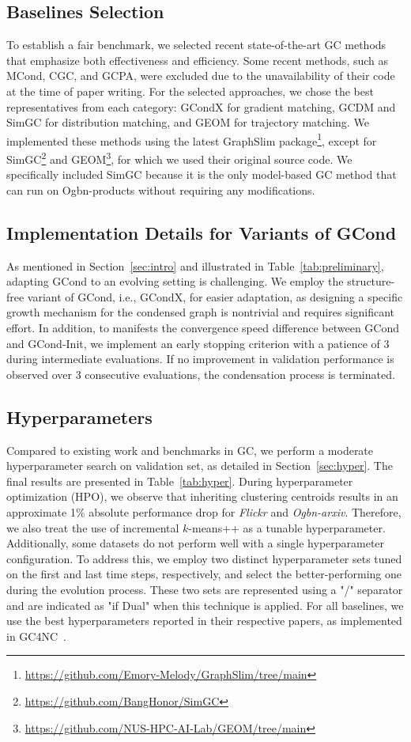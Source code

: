 \subsection{Baselines Selection}
To establish a fair benchmark, we selected recent state-of-the-art GC methods that emphasize both effectiveness and efficiency. Some recent methods, such as MCond, CGC, and GCPA, were excluded due to the unavailability of their code at the time of paper writing. For the selected approaches, we chose the best representatives from each category: GCondX for gradient matching, GCDM and SimGC for distribution matching, and GEOM for trajectory matching. We implemented these methods using the latest GraphSlim package\footnote{\url{https://github.com/Emory-Melody/GraphSlim/tree/main}}, except for SimGC\footnote{\url{https://github.com/BangHonor/SimGC}} and GEOM\footnote{\url{https://github.com/NUS-HPC-AI-Lab/GEOM/tree/main}}, for which we used their original source code. We specifically included SimGC because it is the only model-based GC method that can run on Ogbn-products without requiring any modifications.


\subsection{Implementation Details for Variants of GCond}
As mentioned in Section~\ref{sec:intro} and illustrated in Table~\ref{tab:preliminary}, adapting GCond to an evolving setting is challenging. We employ the structure-free variant of GCond, i.e., GCondX, for easier adaptation, as designing a specific growth mechanism for the condensed graph is nontrivial and requires significant effort.
In addition, to manifests the convergence speed difference between GCond and GCond-Init, we implement an early stopping criterion with a patience of 3 during intermediate evaluations. 
If no improvement in validation performance is observed over 3 consecutive evaluations, the condensation process is terminated.
\subsection{Hyperparameters}\label{app:hyper}
Compared to existing work and benchmarks in GC, we perform a moderate hyperparameter search on validation set, as detailed in Section~\ref{sec:hyper}. The final results are presented in Table~\ref{tab:hyper}. During hyperparameter optimization (HPO), we observe that inheriting clustering centroids results in an approximate 1\% absolute performance drop for \textit{Flickr} and \textit{Ogbn-arxiv}. Therefore, we also treat the use of incremental $k$-means++ as a tunable hyperparameter. Additionally, some datasets do not perform well with a single hyperparameter configuration. To address this, we employ two distinct hyperparameter sets tuned on the first and last time steps, respectively, and select the better-performing one during the evolution process. These two sets are represented using a "/" separator and are indicated as "if Dual" when this technique is applied. For all baselines, we use the best hyperparameters reported in their respective papers, as implemented in GC4NC~\cite{gong2024gc4nc}.

